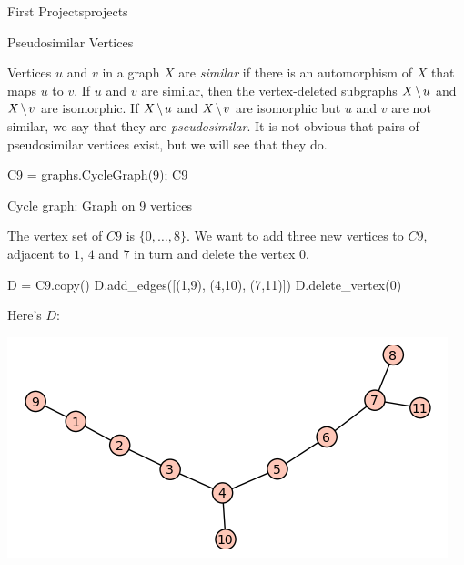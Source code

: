 \begin{chap}{First Projects}{projects}
%
\begin{sect}{Pseudosimilar Vertices}
%
\begin{para}
Vertices $u$ and $v$ in a graph $X$ are \textsl{similar} if there is an automorphism
of $X$ that maps $u$ to $v$. If $u$ and $v$ are similar, then the vertex-deleted
subgraphs $X\mathbin{\mkern-1.5mu\setminus\mkern-1.5mu} u$ and $X\mathbin{\mkern-1.5mu\setminus\mkern-1.5mu} v$ are isomorphic. If $X\mathbin{\mkern-1.5mu\setminus\mkern-1.5mu} u$ and $X\mathbin{\mkern-1.5mu\setminus\mkern-1.5mu} v$ 
are isomorphic but $u$ and $v$ are not similar, we say that they are
\textsl{pseudosimilar}. It is not obvious that pairs of pseudosimilar vertices
exist, but we will see that they do.
\end{para}
%
\begin{sagecode}
\begin{sageinput}
C9 = graphs.CycleGraph(9); C9
\end{sageinput}
\begin{sageoutput}
Cycle graph: Graph on 9 vertices
\end{sageoutput}
\end{sagecode}
%
\begin{para}
The vertex set of $C9$ is $\{0,\ldots,8\}$. We want to add three new vertices
to $C9$, adjacent to $1$, $4$ and $7$ in turn and delete the vertex $0$.
\end{para}
%
\begin{sagecode}
\begin{sageinput}
D = C9.copy()
D.add_edges([(1,9), (4,10), (7,11)])
D.delete_vertex(0)
\end{sageinput}
\end{sagecode}
%
\begin{para}
Here's $D$:
\end{para}
%
\begin{para}
\includegraphics{graphplot.png}
\end{para}

\end{sect}
\end{chap}
